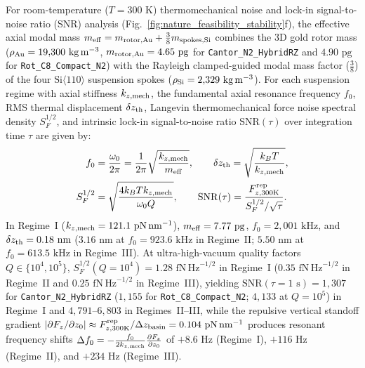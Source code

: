 \documentclass[pdflatex,sn-nature]{sn-jnl}
\DeclareRobustCommand{\roundone}[1]{\fpeval{round(#1,1)}}
\begin{document}
For room-temperature ($T = 300\text{ K}$) thermomechanical noise and lock-in signal-to-noise ratio (SNR) analysis (Fig.~\ref{fig:nature_feasibility_stability}f), the effective axial modal mass $m_{\rm eff} = m_{\rm rotor,Au} + \frac{3}{8}m_{\rm spokes,Si}$ combines the 3D gold rotor mass ($\rho_{\rm Au} = 19{,}300\text{ kg}\,\text{m}^{-3}$, $m_{\rm rotor,Au} = 4.65\text{ pg}$ for \texttt{Cantor\_N2\_HybridRZ} and $4.90\text{ pg}$ for \texttt{Rot\_C8\_Compact\_N2}) with the Rayleigh clamped-guided modal mass factor ($\frac{3}{8}$) of the four $\text{Si}\langle 110\rangle$ suspension spokes ($\rho_{\rm Si} = 2{,}329\text{ kg}\,\text{m}^{-3}$). For each suspension regime with axial stiffness $k_{z,\rm mech}$, the fundamental axial resonance frequency $f_0$, RMS thermal displacement $\delta z_{\rm th}$, Langevin thermomechanical force noise spectral density $S_F^{1/2}$, and intrinsic lock-in signal-to-noise ratio $\mathrm{SNR}(\tau)$ over integration time $\tau$ are given by:
\begin{equation}
\begin{aligned}
f_0 &= \frac{\omega_0}{2\pi} = \frac{1}{2\pi}\sqrt{\frac{k_{z,\rm mech}}{m_{\rm eff}}}, \qquad
\delta z_{\rm th} = \sqrt{\frac{k_B T}{k_{z,\rm mech}}}, \\
S_F^{1/2} &= \sqrt{\frac{4 k_B T k_{z,\rm mech}}{\omega_0 Q}}, \qquad
\mathrm{SNR}(\tau) = \frac{F_{z,300\rm K}^{\rm rep}}{S_F^{1/2} / \sqrt{\tau}}.
\end{aligned}
\label{eq:methods_thermomechanical_snr}
\end{equation}
In Regime~I ($k_{z,\rm mech} = \roundone{\NatureRotCeightCompactNtwoLateralStabilityKZMechPnPerNm}\text{ pN}\,\text{nm}^{-1}$), $m_{\rm eff} = 7.77\text{ pg}$, $f_0 = 2{,}001\text{ kHz}$, and $\delta z_{\rm th} = 0.18\text{ nm}$ ($3.16\text{ nm}$ at $f_0 = 923.6\text{ kHz}$ in Regime~II; $5.50\text{ nm}$ at $f_0 = 613.5\text{ kHz}$ in Regime~III). At ultra-high-vacuum quality factors $Q \in \{10^4, 10^5\}$, $S_F^{1/2}(Q=10^4) = 1.28\text{ fN}\,\text{Hz}^{-1/2}$ in Regime~I ($0.35\text{ fN}\,\text{Hz}^{-1/2}$ in Regime~II and $0.25\text{ fN}\,\text{Hz}^{-1/2}$ in Regime~III), yielding $\mathrm{SNR}(\tau=1\text{ s}) = 1{,}307$ for \texttt{Cantor\_N2\_HybridRZ} ($1{,}155$ for \texttt{Rot\_C8\_Compact\_N2}; $4{,}133$ at $Q=10^5$) in Regime~I and $4{,}791\text{--}6{,}803$ in Regimes~II--III, while the repulsive vertical standoff gradient $|\partial F_z/\partial z_0| \approx F_{z,300\rm K}^{\rm rep}/\Delta z_{\rm basin} = 0.104\text{ pN}\,\text{nm}^{-1}$ produces resonant frequency shifts $\Delta f_0 = -\frac{f_0}{2 k_{z,\rm mech}}\frac{\partial F_z}{\partial z_0}$ of $+8.6\text{ Hz}$ (Regime~I), $+116\text{ Hz}$ (Regime~II), and $+234\text{ Hz}$ (Regime~III).
\end{document}
